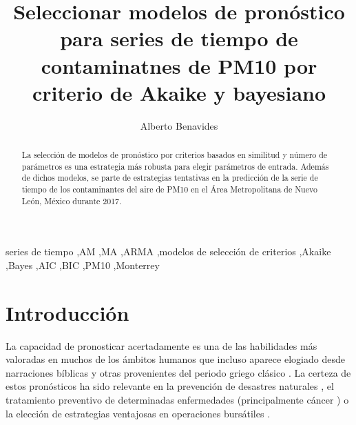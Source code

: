 \documentclass{elsarticle}
\begin{document}
\begin{frontmatter}

\title{Seleccionar modelos de pronóstico para series de tiempo de contaminatnes de PM10 por criterio de Akaike y bayesiano}

\author{Alberto Benavides}
\address{Nuevo León, México}




\begin{abstract}
La selección de modelos de pronóstico por criterios basados en similitud y número de parámetros es una estrategia más robusta para elegir parámetros de entrada. Además de dichos modelos, se parte de estrategias tentativas en la predicción de la serie de tiempo de los contaminantes del aire de PM10 en el Área Metropolitana de Nuevo León, México durante 2017.
\end{abstract}

\begin{keyword}
series de tiempo \sep AM \sep MA \sep ARMA \sep modelos de selección de criterios \sep Akaike \sep Bayes \sep AIC \sep BIC \sep PM10 \sep Monterrey
\end{keyword}

\end{frontmatter}


\section{Introducción}

La capacidad de pronosticar acertadamente es una de las habilidades más valoradas en muchos de los ámbitos humanos que incluso aparece elogiado desde narraciones bíblicas y otras provenientes del periodo griego clásico \cite{Hyndman2018}. La certeza de estos pronósticos ha sido relevante en la prevención de desastres naturales \cite{Cheng2007}, el tratamiento preventivo de determinadas enfermedades (principalmente cáncer \cite{Earnest2019, Kumar2014}) o la elección de estrategias ventajosas en operaciones bursátiles \cite{BabuASReddy2015, Xiao2014}. 
\end{document}
